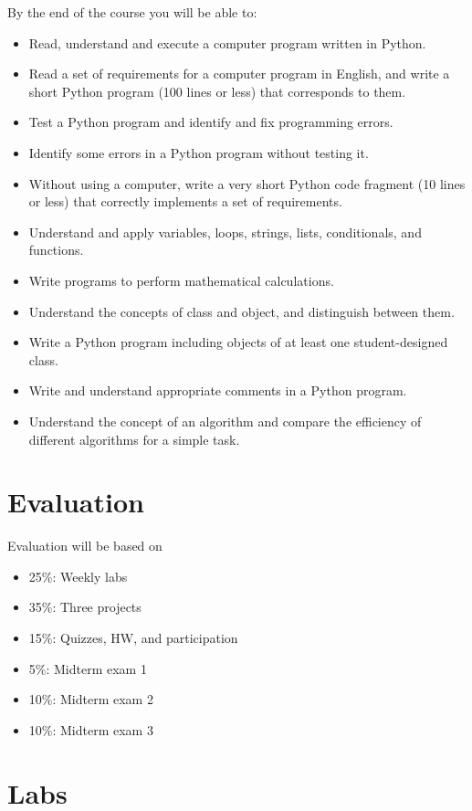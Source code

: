 \documentclass{article}
\begin{document}
By the end of the course you will be able to:

\begin{itemize}
\item Read, understand and execute a computer program written in Python.
\item Read a set of requirements for a computer program in English, and
    write a short Python program (100 lines or less) that corresponds to
    them.
\item Test a Python program and identify and fix programming errors.
\item Identify some errors in a Python program without testing it.
\item Without using a computer, write a very short Python code fragment
    (10 lines or less) that correctly implements a set of requirements.
\item Understand and apply variables, loops, strings, lists, conditionals,
    and functions.
\item Write programs to perform mathematical calculations.
\item Understand the concepts of class and object, and distinguish between
    them.
\item Write a Python program including objects of at least one
    student-designed class.
\item Write and understand appropriate comments in a Python program.
\item Understand the concept of an algorithm and compare the efficiency of
    different algorithms for a simple task.
\end{itemize}

\section*{Evaluation}

Evaluation will be based on
\begin{itemize}
\item 25\%: Weekly labs
\item 35\%: Three projects
\item 15\%: Quizzes, HW, and participation
\item 5\%: Midterm exam 1
\item 10\%: Midterm exam 2
\item 10\%: Midterm exam 3
\end{itemize}

\section*{Labs}
\end{document}

